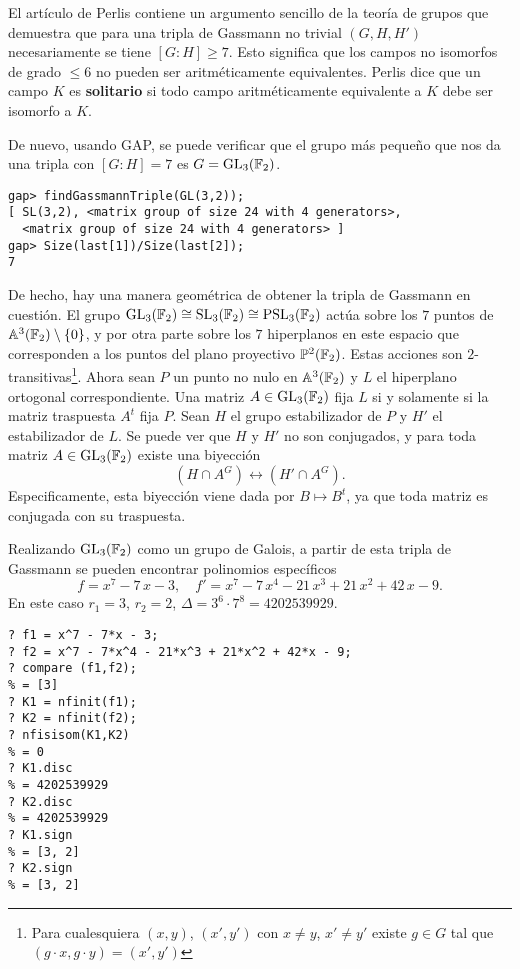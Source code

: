 \begin{ejemplo}
  El artículo de Perlis \cite{Perlis-1977} contiene un argumento sencillo de la
  teoría de grupos que demuestra que para una tripla de Gassmann no trivial
  $(G,H,H')$ necesariamente se tiene $[G : H] \ge 7$. Esto significa que los
  campos no isomorfos de grado $\le 6$ no pueden ser aritméticamente
  equivalentes. Perlis dice que un campo $K$ es \textbf{solitario} si todo campo
  aritméticamente equivalente a $K$ debe ser isomorfo a $K$.

  De nuevo, usando GAP, se puede verificar que el grupo más
  pequeño que nos da una tripla con $[G : H] = 7$ es $G = \operatorname{GL}_3 (\mathbb{F}_2)$.

  \begin{shaded}\small
\begin{verbatim}
gap> findGassmannTriple(GL(3,2));
[ SL(3,2), <matrix group of size 24 with 4 generators>, 
  <matrix group of size 24 with 4 generators> ]
gap> Size(last[1])/Size(last[2]);
7
\end{verbatim}
  \end{shaded}

  De hecho, hay una manera geométrica de obtener la tripla de Gassmann en
  cuestión. El grupo $\operatorname{GL}_3 (\mathbb{F}_2) \cong \operatorname{SL}_3 (\mathbb{F}_2) \cong \operatorname{PSL}_3 (\mathbb{F}_2)$
  actúa sobre los $7$ puntos de $\mathbb{A}^3 (\mathbb{F}_2) \setminus \{ 0 \}$, y por otra
  parte sobre los $7$ hiperplanos en este espacio que corresponden a los puntos
  del plano proyectivo $\mathbb{P}^2 (\mathbb{F}_2)$. Estas acciones son
  $2$-transitivas\footnote{Para cualesquiera $(x,y)$, $(x',y')$ con $x\ne y$,
    $x'\ne y'$ existe $g\in G$ tal que $(g\cdot x, g\cdot y) = (x',y')$}.
  Ahora sean $P$ un punto no nulo en $\mathbb{A}^3 (\mathbb{F}_2)$ y $L$ el hiperplano
  ortogonal correspondiente. Una matriz $A \in \operatorname{GL}_3 (\mathbb{F}_2)$ fija $L$ si y
  solamente si la matriz traspuesta $A^t$ fija $P$. Sean $H$ el grupo
  estabilizador de $P$ y $H'$ el estabilizador de $L$. Se puede ver que $H$ y
  $H'$ no son conjugados, y para toda matriz $A \in \operatorname{GL}_3 (\mathbb{F}_2)$ existe una
  biyección
  $$(H\cap A^G) \leftrightarrow (H'\cap A^G).$$
  Especificamente, esta biyección viene dada por $B\mapsto B^t$, ya que toda
  matriz es conjugada con su traspuesta.

  Realizando $\operatorname{GL}_3 (\mathbb{F}_2)$ como un grupo de Galois, a partir de esta tripla de
  Gassmann se pueden encontrar polinomios específicos
  \[ f = x^7 - 7\,x - 3, \quad
    f' = x^7 - 7\,x^4 - 21\,x^3 + 21\,x^2 + 42\,x - 9. \]
  En este caso $r_1 = 3$, $r_2 = 2$, $\Delta = 3^6\cdot 7^8 = 4202539929$.

  \begin{shaded}\small
\begin{verbatim}
? f1 = x^7 - 7*x - 3;
? f2 = x^7 - 7*x^4 - 21*x^3 + 21*x^2 + 42*x - 9;
? compare (f1,f2);
% = [3]
? K1 = nfinit(f1);
? K2 = nfinit(f2);
? nfisisom(K1,K2)
% = 0
? K1.disc
% = 4202539929
? K2.disc
% = 4202539929
? K1.sign
% = [3, 2]
? K2.sign
% = [3, 2] 
\end{verbatim}
  \end{shaded}
\end{ejemplo}

